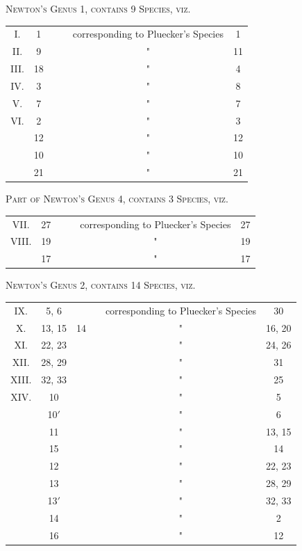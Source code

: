 \documentclass[11pt,a4paper]{article}
\theoremstyle{plain}
\begin{document}
\begin{center}
\textsc{Newton's Genus 1, contains 9 Species, viz.}
\end{center}
\begin{center}
\begin{tabular}{cccccc}
\toprule
I. & 1 & & & corresponding to Pluecker's Species & 1 \\
II. & 9 & & & " & 11 \\
III. & 18 & & & " & 4 \\
IV. & 3 & & & " & 8 \\
V. & 7 & & & " & 7 \\
VI. & 2 & & & " & 3 \\
  & 12 & & & " & 12 \\
  & 10 & & & " & 10 \\
  & 21 & & & " & 21 \\
\bottomrule
\end{tabular}
\end{center}

\begin{center}
\textsc{Part of Newton's Genus 4, contains 3 Species, viz.}
\end{center}
\begin{center}
\begin{tabular}{cccccc}
\toprule
VII. & 27 & & & corresponding to Pluecker's Species & 27 \\
VIII. & 19 & & & " & 19 \\
  & 17 & & & " & 17 \\
\bottomrule
\end{tabular}
\end{center}

\begin{center}
\textsc{Newton's Genus 2, contains 14 Species, viz.}
\end{center}
\begin{center}
\begin{tabular}{cccccc}
\toprule
IX. & 5, 6 & & & corresponding to Pluecker's Species & 30 \\
X. & 13, 15 & 14 & & " & 16, 20 \\
XI. & 22, 23 & & & " & 24, 26 \\
XII. & 28, 29 & & & " & 31 \\
XIII. & 32, 33 & & & " & 25 \\
XIV. & 10 & & & " & 5 \\
  & 10$'$ & & & " & 6 \\
  & 11 & & & " & 13, 15 \\
  & 15 & & & " & 14 \\
  & 12 & & & " & 22, 23 \\
  & 13 & & & " & 28, 29 \\
  & 13$'$ & & & " & 32, 33 \\
  & 14 & & & " & 2 \\
  & 16 & & & " & 12 \\
\bottomrule
\end{tabular}
\end{center}
\end{document}
